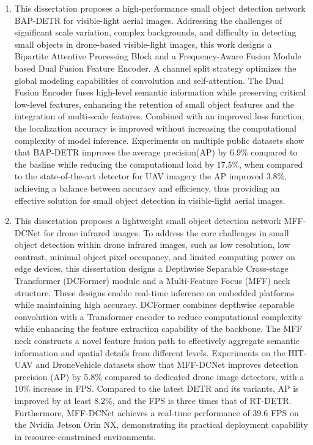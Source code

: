 \begin{englishabstract}
\begin{enumerate}[wide,leftmargin=0pt,itemsep=\baselineskip]

    \item This dissertation proposes a high-performance small object detection network BAP-DETR for visible-light aerial images. Addressing the challenges of significant scale variation, complex backgrounds, and difficulty in detecting small objects in drone-based visible-light images, this work designs a Bipartite Attentive Processing Block and a Frequency-Aware Fusion Module based Dual Fusion Feature Encoder. A channel split strategy optimizes the global modeling capabilities of convolution and self-attention. The Dual Fusion Encoder fuses high-level semantic information while preserving critical low-level features, enhancing the retention of small object features and the integration of multi-scale features. Combined with an improved loss function, the localization accuracy is improved without increasing the computational complexity of model inference. Experiments on multiple public datasets show that BAP-DETR improves the average precision(AP) by 6.9\% compared to the basline while reducing the computational load by 17.5\%, when compared to the state-of-the-art detector for UAV imagery the AP improved 3.8\%, achieving a balance between accuracy and efficiency, thus providing an effective solution for small object detection in visible-light aerial images.
        
    \item This dissertation proposes a lightweight small object detection network MFF-DCNet for drone infrared images. To address the core challenges in small object detection within drone infrared images, such as low resolution, low contrast, minimal object pixel occupancy, and limited computing power on edge devices, this dissertation designs a Depthwise Separable Cross-stage Transformer (DCFormer) module and a Multi-Feature Focus (MFF) neck structure. These designs enable real-time inference on embedded platforms while maintaining high accuracy. DCFormer combines depthwise separable convolution with a Transformer encoder to reduce computational complexity while enhancing the feature extraction capability of the backbone. The MFF neck constructs a novel feature fusion path to effectively aggregate semantic information and spatial details from different levels. Experiments on the HIT-UAV and DroneVehicle datasets show that MFF-DCNet improves detection precision (AP) by 5.8\% compared to dedicated drone image detectors, with a 10\% increase in FPS. Compared to the latest DETR and its variants, AP is improved by at least 8.2\%, and the FPS is three times that of RT-DETR. Furthermore, MFF-DCNet achieves a real-time performance of 39.6 FPS on the Nvidia Jetson Orin NX, demonstrating its practical deployment capability in resource-constrained environments.
        

\end{enumerate}
\end{englishabstract}
